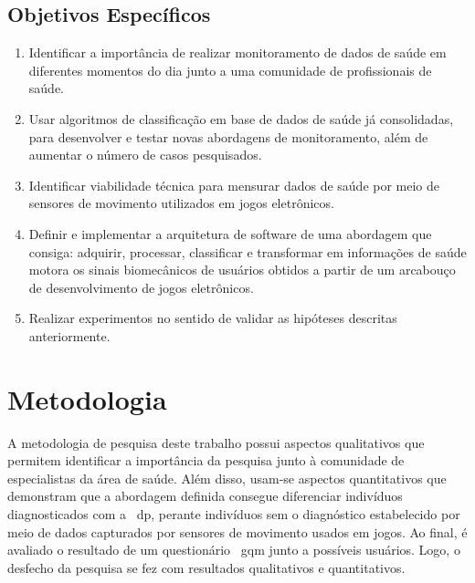 \subsection{Objetivos Específicos}
\begin{enumerate}
		\item Identificar a importância de realizar monitoramento de dados de saúde em diferentes momentos do dia junto a uma comunidade de profissionais de saúde.
		\item Usar algoritmos de classificação em base de dados de saúde já consolidadas, para desenvolver e testar novas abordagens de monitoramento, além de aumentar o número de casos pesquisados.
		\item Identificar viabilidade técnica para mensurar dados de saúde por meio de sensores de movimento utilizados em jogos eletrônicos.
		\item Definir e implementar a arquitetura de software de uma abordagem que consiga: adquirir, processar, classificar e transformar em informações de saúde motora os sinais biomecânicos de usuários obtidos a partir de um arcabouço de desenvolvimento de jogos eletrônicos.
		\item Realizar experimentos no sentido de validar as hipóteses descritas anteriormente.
\end{enumerate}

\section{Metodologia}
A metodologia de pesquisa deste trabalho possui aspectos qualitativos que permitem identificar a importância da pesquisa junto à comunidade de especialistas da área de saúde. Além disso, usam-se aspectos quantitativos que demonstram que a abordagem definida consegue diferenciar indivíduos diagnosticados com a ~\ac{dp}, perante indivíduos sem o diagnóstico estabelecido por meio de dados capturados por sensores de movimento usados em jogos. Ao final, é avaliado o resultado de um questionário ~\ac{gqm} junto a possíveis usuários. Logo, o desfecho da pesquisa se fez com resultados qualitativos e quantitativos.

